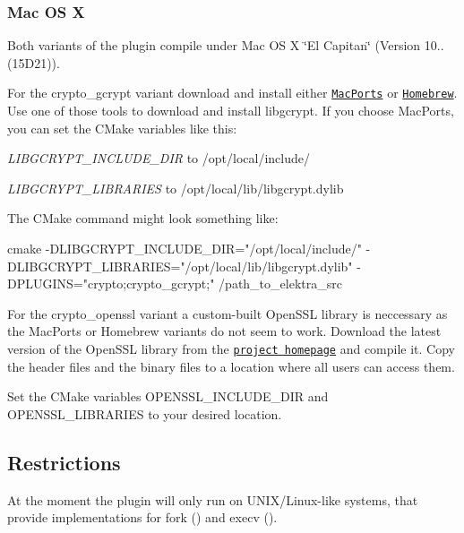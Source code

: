 \subsubsection*{Mac O\+S X}

Both variants of the plugin compile under Mac O\+S X \char`\"{}\+El Capitan\char`\"{} (Version 10.. (15\+D21)).

For the {\ttfamily crypto\+\_\+gcrypt} variant download and install either \href{https://www.macports.org/}{\tt Mac\+Ports} or \href{http://brew.sh/}{\tt Homebrew}. Use one of those tools to download and install {\ttfamily libgcrypt}. If you choose Mac\+Ports, you can set the C\+Make variables like this\+:


\begin{DoxyItemize}
\item {\itshape L\+I\+B\+G\+C\+R\+Y\+P\+T\+\_\+\+I\+N\+C\+L\+U\+D\+E\+\_\+\+D\+I\+R} to {\ttfamily /opt/local/include/}
\item {\itshape L\+I\+B\+G\+C\+R\+Y\+P\+T\+\_\+\+L\+I\+B\+R\+A\+R\+I\+E\+S} to {\ttfamily /opt/local/lib/libgcrypt.dylib}
\end{DoxyItemize}

The C\+Make command might look something like\+: \begin{DoxyVerb}cmake -DLIBGCRYPT_INCLUDE_DIR="/opt/local/include/" -DLIBGCRYPT_LIBRARIES="/opt/local/lib/libgcrypt.dylib" -DPLUGINS="crypto;crypto_gcrypt;" /path_to_elektra_src
\end{DoxyVerb}


For the {\ttfamily crypto\+\_\+openssl} variant a custom-\/built Open\+S\+S\+L library is neccessary as the Mac\+Ports or Homebrew variants do not seem to work. Download the latest version of the Open\+S\+S\+L library from the \href{https://www.openssl.org/source/}{\tt project homepage} and compile it. Copy the header files and the binary files to a location where all users can access them.

Set the C\+Make variables {\ttfamily O\+P\+E\+N\+S\+S\+L\+\_\+\+I\+N\+C\+L\+U\+D\+E\+\_\+\+D\+I\+R} and {\ttfamily O\+P\+E\+N\+S\+S\+L\+\_\+\+L\+I\+B\+R\+A\+R\+I\+E\+S} to your desired location.

\subsection*{Restrictions}

At the moment the plugin will only run on U\+N\+I\+X/\+Linux-\/like systems, that provide implementations for {\ttfamily fork ()} and {\ttfamily execv ()}.

